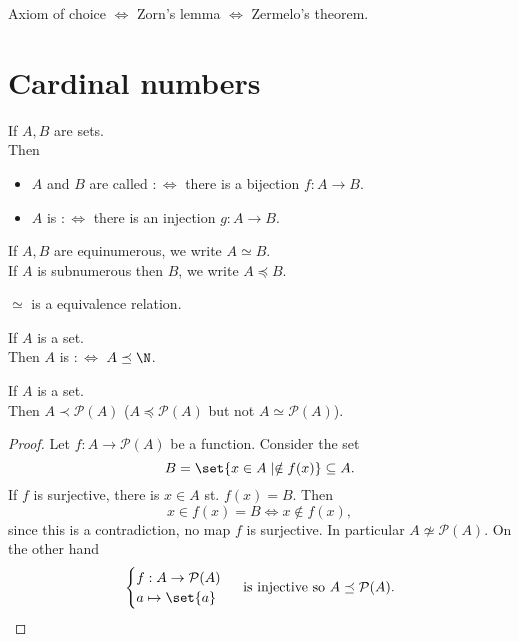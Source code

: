 \begin{recall}
    Axiom of choice $\iff$ Zorn's lemma $\iff$ Zermelo's theorem.
\end{recall}

\section{Cardinal numbers}

\begin{definition}
    If $A,B$ are sets.\\
    Then 
    \begin{itemize}
        \item $A$ and $B$ are called  $:\iff$ there is a bijection $f:A \to B$.
        \item $A$ is  $:\iff$ there is an injection $g:A \to B$.
    \end{itemize}
\end{definition}

\begin{notation}
    If $A,B$ are equinumerous, we write $A \simeq B$.\\
    If $A$ is subnumerous then $B$, we write $A \preceq B$.
\end{notation}

\begin{remark}
    $\simeq$ is a equivalence relation.
\end{remark}

\begin{definition}
    If $A$ is a set.\\
    Then $A$ is  $:\iff$ $A \preceq \N$.
\end{definition}

\begin{theorem}[Cantor]
    If $A$ is a set.\\
    Then $A \prec \mathcal{P}(A)$ ($A \preceq \mathcal{P}(A)$ but not $A \simeq \mathcal{P}(A)$).
\end{theorem}
\begin{proof}
    Let $f: A \to \mathcal{P}(A)$ be a function. Consider the set
    $$ B = \set{x \in A \mid \notin f(x)} \subseteq A.$$
    If $f$ is surjective, there is $x \in A$ st. $f(x) = B$.
    Then 
    $$ x \in f(x) = B \iff x \notin f(x), $$
    since this is a contradiction, no map $f$ is surjective. In particular $A \not \simeq \mathcal{P}(A)$.
    On the other hand
    $$\begin{cases}
        f: A \to \mathcal{P}(A)\\
        a \mapsto \set{a}
    \end{cases} \text{ is injective so } A \preceq \mathcal{P}(A).$$
\end{proof}

